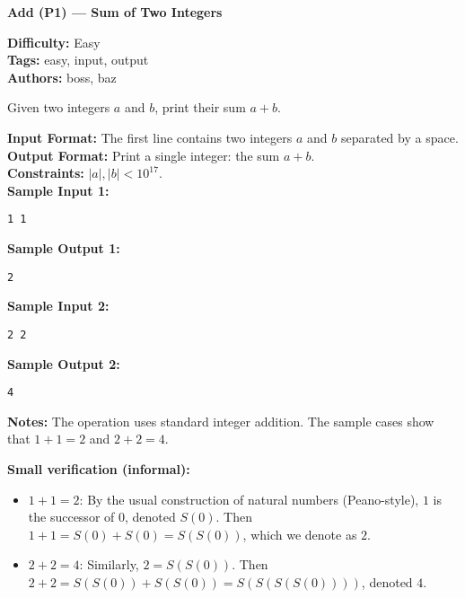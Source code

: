 \documentclass[11pt,a4paper]{article}
\newcommand{\ProblemTitle}[1]{\begin{center}\LARGE\bfseries #1\end{center}\vspace{6pt}}
\newcommand{\Difficulty}[1]{\noindent\textbf{Difficulty:} #1\\}
\newcommand{\Tags}[1]{\noindent\textbf{Tags:} #1\\}
\newcommand{\Authors}[1]{\noindent\textbf{Authors:} #1\\}
\newcommand{\Statement}[1]{\vspace{6pt}\begin{tcolorbox}[colback=white,colframe=black!60,boxrule=0.5pt]\noindent #1\end{tcolorbox}\vspace{8pt}}
\newcommand{\InputFormat}[1]{\noindent\textbf{Input Format:} #1\\}
\newcommand{\OutputFormat}[1]{\noindent\textbf{Output Format:} #1\\}
\newcommand{\Constraints}[1]{\noindent\textbf{Constraints:} #1\\}
\begin{document}
\ProblemTitle{Add (P1) — Sum of Two Integers}
\Difficulty{Easy}
\Tags{easy, input, output}
\Authors{boss, baz}

\Statement{
Given two integers $a$ and $b$, print their sum $a + b$.
}

\InputFormat{The first line contains two integers $a$ and $b$ separated by a space.}
\OutputFormat{Print a single integer: the sum $a + b$.}
\Constraints{$|a|,|b| < 10^{17}$.}

\noindent\textbf{Sample Input 1:}
\begin{verbatim}
1 1
\end{verbatim}
\noindent\textbf{Sample Output 1:}
\begin{verbatim}
2
\end{verbatim}

\noindent\textbf{Sample Input 2:}
\begin{verbatim}
2 2
\end{verbatim}
\noindent\textbf{Sample Output 2:}
\begin{verbatim}
4
\end{verbatim}

\noindent\textbf{Notes:}  The operation uses standard integer addition. The sample cases show that $1+1=2$ and $2+2=4$.

\vspace{8pt}
\noindent\textbf{Small verification (informal):}
\begin{itemize}[leftmargin=*]
  \item $1+1=2$: By the usual construction of natural numbers (Peano-style), $1$ is the successor of $0$, denoted $S(0)$. Then $1+1=S(0)+S(0)=S(S(0))$, which we denote as $2$.
  \item $2+2=4$: Similarly, $2=S(S(0))$. Then $2+2=S(S(0))+S(S(0))=S(S(S(S(0))))$, denoted $4$.
\end{itemize}
\end{document}
